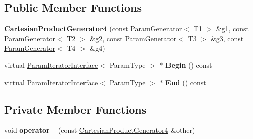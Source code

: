 \subsection*{Public Member Functions}
\begin{DoxyCompactItemize}
\item 
\mbox{\label{classtesting_1_1internal_1_1_cartesian_product_generator4_a4e4512b35f0d71f7a718ded6fe829296}} 
{\bfseries Cartesian\+Product\+Generator4} (const \mbox{\hyperlink{classtesting_1_1internal_1_1_param_generator}{Param\+Generator}}$<$ T1 $>$ \&g1, const \mbox{\hyperlink{classtesting_1_1internal_1_1_param_generator}{Param\+Generator}}$<$ T2 $>$ \&g2, const \mbox{\hyperlink{classtesting_1_1internal_1_1_param_generator}{Param\+Generator}}$<$ T3 $>$ \&g3, const \mbox{\hyperlink{classtesting_1_1internal_1_1_param_generator}{Param\+Generator}}$<$ T4 $>$ \&g4)
\item 
\mbox{\label{classtesting_1_1internal_1_1_cartesian_product_generator4_a2d47d5c0544eeaaff895ba41f825ae3f}} 
virtual \mbox{\hyperlink{classtesting_1_1internal_1_1_param_iterator_interface}{Param\+Iterator\+Interface}}$<$ Param\+Type $>$ $\ast$ {\bfseries Begin} () const
\item 
\mbox{\label{classtesting_1_1internal_1_1_cartesian_product_generator4_a77f18e56a5a9271a1b3b0dff381a5bd3}} 
virtual \mbox{\hyperlink{classtesting_1_1internal_1_1_param_iterator_interface}{Param\+Iterator\+Interface}}$<$ Param\+Type $>$ $\ast$ {\bfseries End} () const
\end{DoxyCompactItemize}
\subsection*{Private Member Functions}
\begin{DoxyCompactItemize}
\item 
\mbox{\label{classtesting_1_1internal_1_1_cartesian_product_generator4_ad04c3d7a347b98ba888fee76fc46b1a4}} 
void {\bfseries operator=} (const \mbox{\hyperlink{classtesting_1_1internal_1_1_cartesian_product_generator4}{Cartesian\+Product\+Generator4}} \&other)
\end{DoxyCompactItemize}
